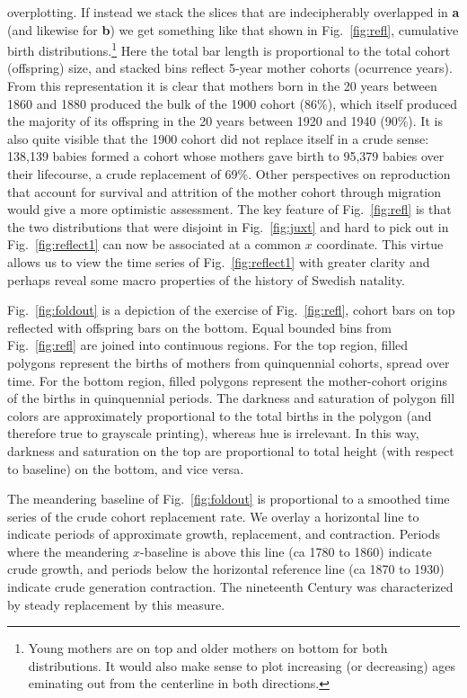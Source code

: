 \documentclass{article}
\begin{document}
overplotting. If instead we stack the slices that are indecipherably overlapped
in \textbf{a} (and likewise for \textbf{b}) we get something like that shown in
Fig.~\ref{fig:refl}, cumulative birth distributions.\footnote{Young mothers are
on top and older mothers on bottom for both distributions. It would also make
sense to plot increasing (or decreasing) ages eminating out from the centerline
in both directions.} Here the total bar length is proportional to the total
cohort (offspring) size, and stacked bins reflect 5-year mother cohorts
(ocurrence years). From this representation it is clear that mothers born in the
20 years between 1860 and 1880 produced the bulk of the 1900 cohort (86\%),
which itself produced the majority of its offspring in the 20 years between 1920
and 1940 (90\%). It is also quite visible that the 1900 cohort did not replace
itself in a crude sense: 138,139 babies formed a cohort whose mothers gave birth
to 95,379 babies over their lifecourse, a crude replacement of 69\%. Other
perspectives on reproduction that account for survival and attrition of the
mother cohort through migration would give a more optimistic assessment. The key
feature of Fig.~\ref{fig:refl} is that the two distributions that were disjoint in Fig.~\ref{fig:juxt} and hard to pick out in Fig.~\ref{fig:reflect1} can now be associated at a common $x$ coordinate. This virtue allows us to view the time series of Fig.~\ref{fig:reflect1} with greater clarity and perhaps reveal some macro properties of the history of Swedish natality.

Fig.~\ref{fig:foldout} is a depiction of the exercise of Fig.~\ref{fig:refl}, cohort bars on top reflected with offspring bars on the bottom. Equal bounded bins from Fig.~\ref{fig:refl} are joined into continuous regions. For the top region, filled polygons represent the births of mothers from quinquennial cohorts, spread over time. For the bottom region, filled polygons represent the mother-cohort origins of the births in quinquennial periods. The darkness and saturation of polygon fill colors are approximately proportional to the total births in the polygon (and therefore true to grayscale printing), whereas hue is irrelevant. In this way, darkness and saturation on the top are proportional to total height (with respect to baseline) on the bottom, and vice versa. 

The meandering baseline of Fig.~\ref{fig:foldout} is proportional to a smoothed time series of the crude cohort replacement rate. We overlay a horizontal line to indicate periods of approximate growth, replacement, and contraction. Periods where the meandering $x$-baseline is above this line (ca 1780 to 1860) indicate crude growth, and periods below the horizontal reference line (ca 1870 to 1930) indicate crude generation contraction. The nineteenth Century was characterized by steady replacement by this measure.
\end{document}
